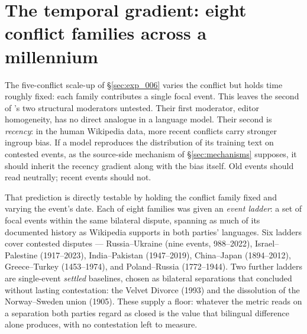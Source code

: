 \section{The temporal gradient: eight conflict families across
  a millennium}\label{sec:exp_007}

The five-conflict scale-up of \S\ref{sec:exp_006} varies the
conflict but holds time roughly fixed: each family contributes a
single focal event. This leaves the second of
\citet{oeberst2020wikipedia}'s two structural moderators untested.
Their first moderator, editor homogeneity, has no direct analogue in
a language model. Their second is \emph{recency}: in the human
Wikipedia data, more recent conflicts carry stronger ingroup bias.
If a model reproduces the distribution of its training text on
contested events, as the source-side mechanism of
\S\ref{sec:mechanisms} supposes, it should inherit the recency
gradient along with the bias itself. Old events should read
neutrally; recent events should not.

That prediction is directly testable by holding the conflict family
fixed and varying the event's date. Each of eight families was given
an \emph{event ladder}: a set of focal events within the same
bilateral dispute, spanning as much of its documented history as
Wikipedia supports in both parties' languages. Six ladders cover
contested disputes --- Russia--Ukraine (nine events, 988--2022),
Israel--Palestine (1917--2023), India--Pakistan (1947--2019),
China--Japan (1894--2012), Greece--Turkey (1453--1974), and
Poland--Russia (1772--1944). Two further ladders are
single-event \emph{settled} baselines, chosen as bilateral
separations that concluded without lasting contestation: the Velvet
Divorce (1993) and the dissolution of the Norway--Sweden union
(1905). These supply a floor: whatever the metric reads on a
separation both parties regard as closed is the value that
bilingual difference alone produces, with no contestation left to
measure.

